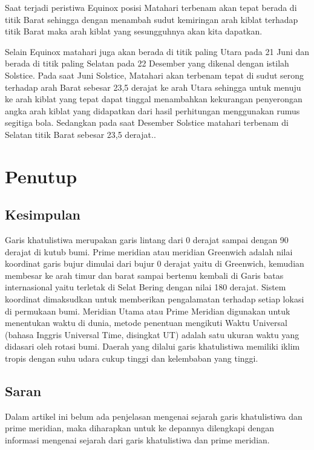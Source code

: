 	Saat terjadi peristiwa Equinox posisi Matahari terbenam akan tepat berada di titik Barat sehingga dengan menambah sudut kemiringan arah kiblat 
terhadap titik Barat maka arah kiblat yang sesungguhnya akan kita dapatkan. 

	Selain Equinox matahari juga akan berada di titik paling Utara pada 21 Juni dan berada di titik paling Selatan pada 22 Desember yang dikenal dengan 
istilah Solstice. Pada saat Juni Solstice, Matahari akan terbenam tepat di sudut serong terhadap arah Barat sebesar 23,5 derajat ke arah Utara
sehingga untuk menuju ke arah kiblat yang tepat dapat tinggal menambahkan kekurangan penyerongan angka arah kiblat yang didapatkan dari hasil perhitungan 
menggunakan rumus segitiga bola. Sedangkan pada saat Desember Solstice matahari terbenam di Selatan titik Barat sebesar 23,5 derajat.\cite {arkanudin2008teknik}.

\section {Penutup}

\subsection{Kesimpulan}
	
	Garis khatulistiwa merupakan garis lintang dari 0 derajat sampai dengan 90 derajat di kutub bumi. Prime meridian atau meridian Greenwich adalah 
nilai koordinat garis bujur dimulai dari bujur 0 derajat yaitu di Greenwich, kemudian membesar ke arah timur dan barat sampai bertemu kembali di Garis batas 
internasional yaitu terletak di Selat Bering dengan nilai 180 derajat. Sistem koordinat dimaksudkan untuk memberikan pengalamatan terhadap setiap lokasi 
di permukaan bumi. Meridian Utama atau Prime Meridian digunakan untuk menentukan waktu di dunia, metode penentuan mengikuti Waktu Universal (bahasa 
Inggris Universal Time, disingkat UT) adalah satu ukuran waktu yang didasari oleh rotasi bumi. Daerah yang dilalui garis khatulistiwa memiliki iklim tropis 
dengan suhu udara cukup tinggi dan kelembaban yang tinggi.

\subsection{Saran}

	Dalam artikel ini belum ada penjelasan mengenai sejarah garis khatulistiwa dan prime meridian, maka diharapkan untuk  ke depannya dilengkapi dengan 
informasi mengenai sejarah dari garis khatulistiwa dan prime meridian.	
